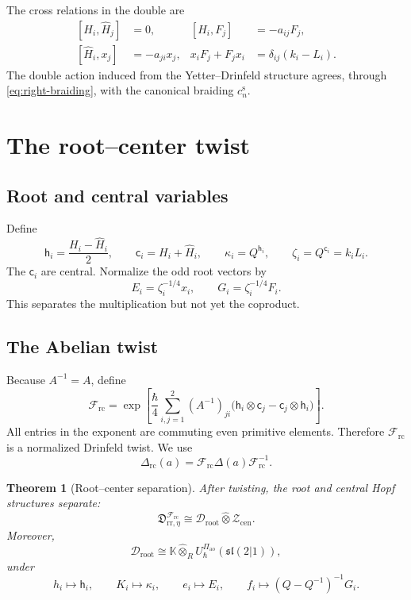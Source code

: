 \documentclass[11pt,a4paper]{article}
\newcommand{\hK}{\mathbb K}
\newcommand{\ot}{\otimes}
\newcommand{\hot}{\widehat\otimes}
\newcommand{\ao}{\mathrm{ao}}
\newcommand{\rc}{\mathrm{rc}}
\newcommand{\cen}{\mathrm{cen}}
\newcommand{\rootpart}{\mathrm{root}}
\newtheorem{theorem}{Theorem}[section]
\theoremstyle{definition}
\theoremstyle{remark}
\begin{document}
The cross relations in the double are
\begin{equation}\label{eq:double-cross}
\begin{aligned}
 [H_i,\widehat H_j]&=0,&
 [H_i,F_j]&=-a_{ij}F_j,\\
 [\widehat H_i,x_j]&=-a_{ji}x_j,&
 x_iF_j+F_jx_i&=\delta_{ij}(k_i-L_i).
\end{aligned}
\end{equation}
The double action induced from the Yetter--Drinfeld structure agrees,
through \eqref{eq:right-braiding}, with the canonical braiding
\(c_n^{\mathrm s}\).

\section{The root--center twist}\label{sec:root-center}

\subsection{Root and central variables}

Define
\begin{equation}\label{eq:root-center-Cartan}
 \mathsf h_i=\frac{H_i-\widehat H_i}{2},\qquad
 \mathsf c_i=H_i+\widehat H_i,\qquad
 \kappa_i=Q^{\mathsf h_i},\qquad
 \zeta_i=Q^{\mathsf c_i}=k_iL_i.
\end{equation}
The \(\mathsf c_i\) are central.  Normalize the odd root vectors by
\begin{equation}\label{eq:root-generators}
 E_i=\zeta_i^{-1/4}x_i,\qquad
 G_i=\zeta_i^{-1/4}F_i.
\end{equation}
This separates the multiplication but not yet the coproduct.

\subsection{The Abelian twist}

Because \(A^{-1}=A\), define
\begin{equation}\label{eq:Frc}
\mathcal F_{\rc}
=
\exp\!\left[
\frac{\hbar}{4}
\sum_{i,j=1}^2(A^{-1})_{ji}
\bigl(\mathsf h_i\ot\mathsf c_j-\mathsf c_j\ot\mathsf h_i\bigr)
\right].
\end{equation}
All entries in the exponent are commuting even primitive elements.
Therefore \(\mathcal F_{\rc}\) is a normalized Drinfeld twist.  We use
\[
 \Delta_{\rc}(a)=\mathcal F_{\rc}\Delta(a)\mathcal F_{\rc}^{-1}.
\]

\begin{theorem}[Root--center separation]\label{thm:root-center}
After twisting, the root and central Hopf structures separate:
\begin{equation}\label{eq:Hopf-factor}
 \mathfrak D_{\mathrm{rr},\eta}^{\mathcal F_{\rc}}
 \cong\mathcal D_{\rootpart}\hot\mathcal Z_{\cen}.
\end{equation}
Moreover,
\[
 \mathcal D_{\rootpart}
 \cong
 \hK\hot_R U_\hbar^{\Pi_{\ao}}(\mathfrak{sl}(2|1)),
\]
under
\[
 h_i\mapsto\mathsf h_i,\qquad
 K_i\mapsto\kappa_i,\qquad
 e_i\mapsto E_i,\qquad
 f_i\mapsto(Q-Q^{-1})^{-1}G_i.
\]
\end{theorem}
\end{document}
